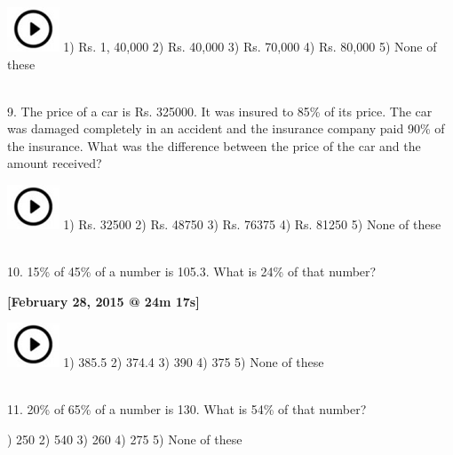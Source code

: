 \documentclass{article}
\begin{document}
\noindent \includegraphics*[width=0.61in, height=0.52in]{images/image1} 1) Rs. 1, 40,000          2) Rs. 40,000       3) Rs. 70,000       4) Rs. 80,000       5) None of these

\noindent 

\noindent 

\noindent \\ 9.   The price of a car is Rs. 325000. It was insured to 85\% of its price. The car was    damaged completely in an accident and the insurance company paid 90\% of the insurance. What was the difference between the price of the car and the amount received?

\noindent \includegraphics*[width=0.61in, height=0.52in]{images/image1} 1) Rs. 32500               2) Rs. 48750        3) Rs. 76375        4) Rs. 81250        5) None of these

\noindent 

\noindent 

\noindent \\ 10. 15\% of 45\% of a number is 105.3. What is 24\% of that number?

\noindent \textbf{[February 28, 2015 @ 24m 17s]}

\noindent \includegraphics*[width=0.61in, height=0.52in]{images/image1} 1) 385.5                   2) 374.4            3) 390               4) 375               5) None of these

\noindent 

\noindent 

\noindent \\  11. 20\% of 65\% of a number is 130. What is 54\% of that number?

\noindent 

) 250                      2) 540               3) 260               4) 275               5) None of these

\noindent 

\noindent 
\end{document}
